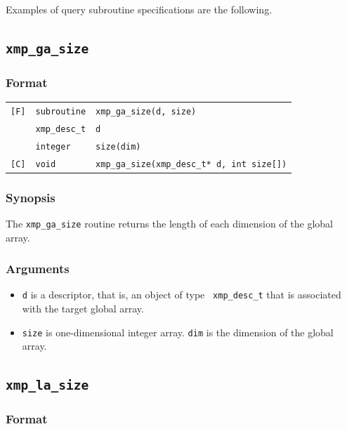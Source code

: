 Examples of query subroutine specifications are the following.

\subsection{\tt xmp\_ga\_size}

\subsubsection*{Format}

\begin{tabular}{lll}

\verb![F]!& {\tt subroutine}& {\tt xmp\_ga\_size(d, size)}\\
          & {\tt xmp\_desc\_t} & {\tt d}\\
          & {\tt integer} & {\tt size(dim)}\\

\verb![C]!&  {\tt void}& {\tt xmp\_ga\_size(xmp\_desc\_t* d, int size[])}\\

\end{tabular}

\subsubsection*{Synopsis}

The {\tt xmp\_ga\_size} routine returns the length of each dimension of the global array.

\subsubsection*{Arguments}

\begin{itemize}
 \item {\tt d} is a descriptor, that is, an object of type {\tt
       xmp\_desc\_t} that is associated with the target global array.
 \item {\tt size} is one-dimensional integer array. {\tt dim} is the dimension 
       of the global array.
\end{itemize}

\subsection{\tt xmp\_la\_size}

\subsubsection*{Format}

